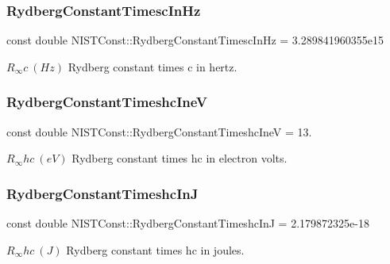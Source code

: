 \subsubsection{\texorpdfstring{Rydberg\+Constant\+Timesc\+In\+Hz}{RydbergConstantTimescInHz}}
{\footnotesize\ttfamily const double N\+I\+S\+T\+Const\+::\+Rydberg\+Constant\+Timesc\+In\+Hz = 3.\+289841960355e15}

$R_\infty c \ (Hz)$ Rydberg constant times c in hertz. \mbox{\label{group___rydberg_constant_ga77c7dd314342e7f121d9b8775a45d20f}} 
\subsubsection{\texorpdfstring{Rydberg\+Constant\+Timeshc\+IneV}{RydbergConstantTimeshcIneV}}
{\footnotesize\ttfamily const double N\+I\+S\+T\+Const\+::\+Rydberg\+Constant\+Timeshc\+IneV = 13.}

$R_\infty hc \ (eV)$ Rydberg constant times hc in electron volts. \mbox{\label{group___rydberg_constant_gaa4164006d51dbf240eb83065e83bddec}} 
\subsubsection{\texorpdfstring{Rydberg\+Constant\+Timeshc\+InJ}{RydbergConstantTimeshcInJ}}
{\footnotesize\ttfamily const double N\+I\+S\+T\+Const\+::\+Rydberg\+Constant\+Timeshc\+InJ = 2.\+179872325e-\/18}

$R_\infty hc \ (J)$ Rydberg constant times hc in joules. 